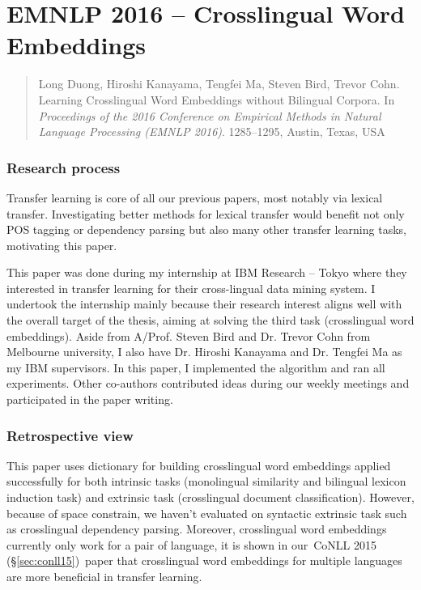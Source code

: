 \documentclass[12pt,twoside,final,hidelinks]{ltthesis}
\theoremstyle{definition}
\newcommand\conllv{CoNLL 2015 (\S\ref{sec:conll15})}
\begin{document}





\section{EMNLP 2016 -- Crosslingual Word Embeddings}
\label{sec:emnlp16}
\begin{quote}
Long Duong, Hiroshi Kanayama, Tengfei Ma, Steven Bird, Trevor Cohn. Learning Crosslingual Word Embeddings without Bilingual Corpora. In \textit{Proceedings of the 2016 Conference on Empirical Methods in Natural Language Processing (EMNLP 2016)}. 1285--1295, Austin, Texas, USA\
\end{quote}

\subsubsection{Research process}
Transfer learning is core of all our previous papers, most notably via lexical transfer. Investigating better methods for lexical transfer would benefit not only POS tagging or dependency parsing but also many other transfer learning tasks, motivating this paper. 

This paper was done during my internship at IBM Research -- Tokyo where they interested in transfer learning for their cross-lingual data mining system. I undertook the 
internship mainly because their research interest aligns well with the overall target of the thesis, aiming at solving the third task (crosslingual 
word embeddings). Aside from A/Prof. Steven Bird and Dr. Trevor Cohn from Melbourne university, I also have Dr. Hiroshi Kanayama and Dr. Tengfei Ma as my IBM supervisors. In this paper, I implemented the algorithm and ran all experiments. Other co-authors contributed ideas during our weekly meetings and participated in the paper writing. 

\subsubsection{Retrospective view}
This paper uses dictionary for building crosslingual word embeddings applied successfully for both intrinsic tasks (monolingual similarity and bilingual lexicon
induction task) and extrinsic task (crosslingual document classification). However, because of space constrain, we haven't evaluated on syntactic extrinsic task such as 
crosslingual dependency parsing. Moreover, crosslingual word embeddings currently only work for a pair of language, it is shown in our~\conllv\ paper that crosslingual word embeddings for multiple languages are more beneficial in transfer learning. 
\end{document}
